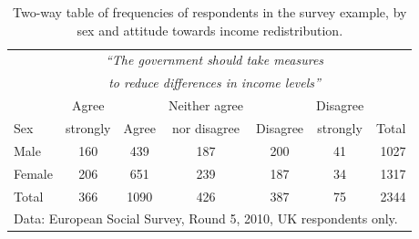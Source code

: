 \begin{table}
\caption{Two-way table of frequencies of respondents in the survey example,
by sex and attitude towards income redistribution.}
\label{t_sex_attitude}
\begin{center}
\begin{tabular}{|l|ccccc|r|}\hline
& \multicolumn{5}{|c|}{\emph{``The government should
take measures}} & \\
& \multicolumn{5}{|c|}{\emph{to reduce differences in income levels''}}
& \\
 & Agree & & Neither agree & & Disagree & \\
Sex & strongly & Agree & nor disagree & Disagree & strongly & Total \\ \hline
Male &  160& 439 & 187 &200  & 41 & 1027 \\
Female & 206 & 651 & 239 & 187 & 34 & 1317\\
\hline
Total & 366 & 1090 & 426 & 387 & 75 & 2344 \\
\hline
\multicolumn{7}{l}{\scriptsize Data: European Social Survey, Round 5,
2010, UK respondents only.}
\end{tabular}
\end{center}

\end{table}

